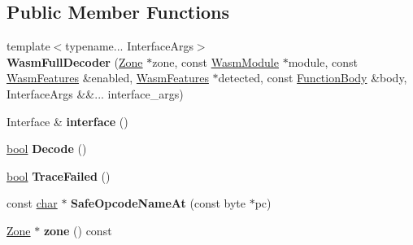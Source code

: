 \subsection*{Public Member Functions}
\begin{DoxyCompactItemize}
\item 
\mbox{\label{classv8_1_1internal_1_1wasm_1_1WasmFullDecoder_a1359f0fe8aa0e9d62c300e995e2ff865}} 
{\footnotesize template$<$typename... Interface\+Args$>$ }\\{\bfseries Wasm\+Full\+Decoder} (\mbox{\hyperlink{classv8_1_1internal_1_1Zone}{Zone}} $\ast$zone, const \mbox{\hyperlink{structv8_1_1internal_1_1wasm_1_1WasmModule}{Wasm\+Module}} $\ast$module, const \mbox{\hyperlink{structv8_1_1internal_1_1wasm_1_1WasmFeatures}{Wasm\+Features}} \&enabled, \mbox{\hyperlink{structv8_1_1internal_1_1wasm_1_1WasmFeatures}{Wasm\+Features}} $\ast$detected, const \mbox{\hyperlink{structv8_1_1internal_1_1wasm_1_1FunctionBody}{Function\+Body}} \&body, Interface\+Args \&\&... interface\+\_\+args)
\item 
\mbox{\label{classv8_1_1internal_1_1wasm_1_1WasmFullDecoder_a55f01185f6536f146ce164f6ed7d916a}} 
Interface \& {\bfseries interface} ()
\item 
\mbox{\label{classv8_1_1internal_1_1wasm_1_1WasmFullDecoder_ab515da3ad88617021858c8098ddd2b98}} 
\mbox{\hyperlink{classbool}{bool}} {\bfseries Decode} ()
\item 
\mbox{\label{classv8_1_1internal_1_1wasm_1_1WasmFullDecoder_adc0f800ede12bba924edadce98036e77}} 
\mbox{\hyperlink{classbool}{bool}} {\bfseries Trace\+Failed} ()
\item 
\mbox{\label{classv8_1_1internal_1_1wasm_1_1WasmFullDecoder_a1708b809fd785ad97461985d2115ffeb}} 
const \mbox{\hyperlink{classchar}{char}} $\ast$ {\bfseries Safe\+Opcode\+Name\+At} (const byte $\ast$pc)
\item 
\mbox{\label{classv8_1_1internal_1_1wasm_1_1WasmFullDecoder_a8647f12bd9c1dd255c10091e9826f1ec}} 
\mbox{\hyperlink{classv8_1_1internal_1_1Zone}{Zone}} $\ast$ {\bfseries zone} () const

\end{DoxyCompactItemize}
